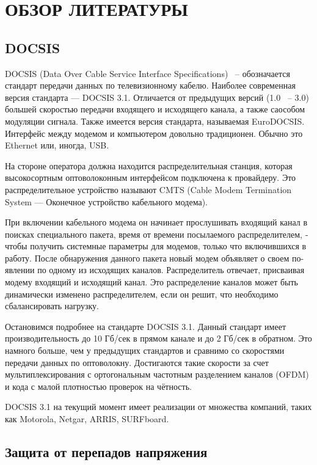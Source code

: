\section{ОБЗОР ЛИТЕРАТУРЫ}
\label{sec:domain}

\subsection{DOCSIS}

DOCSIS (Data Over Cable Service Interface Specifications) ~-- обозначается стандарт передачи данных по телевизионному кабелю. 
Наиболее современная версия стандарта — DOCSIS 3.1. Отличается от предыдущих версий (1.0 ~-- 3.0) большей скоростью передачи
входящего и исходящего канала, а также саособом модуляции сигнала. Также имеется версия стандарта,
называемая EuroDOCSIS. Интерфейс между модемом и компьютером довольно традиционен. Обычно это
Ethernet или, иногда, USB. 

На стороне оператора должна находится распределительная станция, которая 
высокосортным оптоволоконным интерфейсом подключена к провайдеру. Это 
распределительное устройство называют CMTS (Cable Modem Termination System —
Оконечное устройство кабельного модема). 

При включении кабельного модема он начинает прослушивать входящий канал
в поисках специального пакета, время от времени посылаемого распределителем,
­чтобы получить системные параметры для модемов, только что включившихся
в ра­боту. После обнаружения данного пакета новый модем объявляет о своем по-
явлении по одному из исходящих каналов. Распределитель отвечает, присваивая
модему входящий и исходящий канал. Это распределение каналов может быть динамически 
изменено распределителем, если он решит, что необходимо сбалансировать нагрузку.

Остановимся подробнее на стандарте DOCSIS 3.1. Данный стандарт имеет производительность до 10 Гб/сек в прямом канале и до 2 Гб/сек в обратном. 
Это намного больше, чем у предыдущих стандартов и сравнимо со скоростями передачи данных по оптоволокну. Достигаются такие скорости 
за счет мультиплексирования с ортогональным частотным разделением каналов (OFDM) и кода с малой плотностью проверок на чётность.

DOCSIS 3.1 на текущий момент имеет реализации от множества компаний, таких как Motorola, Netgar, ARRIS, SURFboard.

\subsection{Защита от перепадов напряжения}

